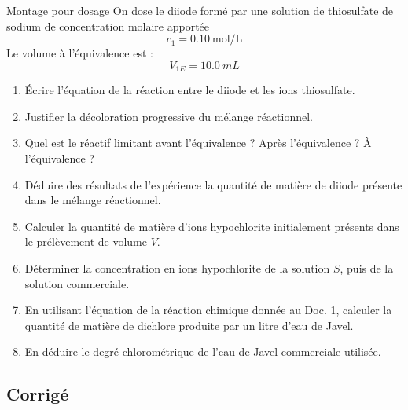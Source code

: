 \documentclass[a4paper,fontsize=11pt,fleqn]{scrartcl}
\begin{document}
\begin{documentboxenv}{Montage pour dosage}
On dose le diiode formé par une solution de thiosulfate de sodium de concentration molaire apportée
\[
c_1 = \SI{0,10}{\mole\per\liter}
\]
Le volume à l'équivalence est :
\[
V_{1E} = \SI{10,0}{mL}
\]
\end{documentboxenv}

\begin{enumerate}
    \item Écrire l'équation de la réaction entre le diiode et les ions thiosulfate.
    \item Justifier la décoloration progressive du mélange réactionnel.
    \item Quel est le réactif limitant avant l'équivalence ? Après l'équivalence ? À l'équivalence ?
    \item Déduire des résultats de l'expérience la quantité de matière de diiode présente dans le mélange réactionnel.
    \item Calculer la quantité de matière d'ions hypochlorite initialement présents dans le prélèvement de volume $V$.
    \item Déterminer la concentration en ions hypochlorite de la solution $S$, puis de la solution commerciale.
    \item En utilisant l'équation de la réaction chimique donnée au Doc. 1, calculer la quantité de matière de dichlore produite par un litre d'eau de Javel.
    \item En déduire le degré chlorométrique de l'eau de Javel commerciale utilisée.
\end{enumerate}

\subsection*{Corrigé}
\end{document}
